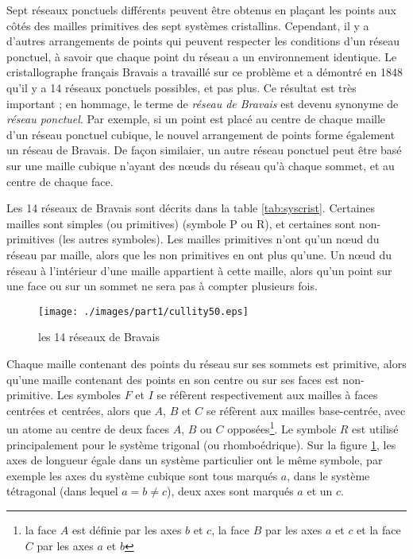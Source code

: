 Sept réseaux ponctuels différents peuvent être obtenus en plaçant les
points aux côtés des mailles primitives des sept systèmes cristallins. Cependant,
il y a d'autres arrangements de points qui peuvent respecter les conditions d'un
réseau ponctuel, à savoir que chaque point du réseau a un environnement
identique. Le cristallographe français Bravais a travaillé sur ce problème et a
démontré en 1848 qu'il y a 14 réseaux ponctuels possibles, et pas plus. Ce
résultat est très important ; en hommage, le terme de \emph{réseau de Bravais}
est devenu synonyme de \emph{réseau ponctuel}. Par exemple, si un point est placé
au centre de chaque maille d'un réseau ponctuel cubique, le nouvel arrangement de
points forme également un réseau de Bravais. De façon similaier, un autre réseau
ponctuel peut être basé sur une maille cubique n'ayant des nœuds du réseau qu'à
chaque sommet, et au centre de chaque face.

Les 14 réseaux de Bravais sont décrits dans la table \ref{tab:syscrist}.
Certaines mailles sont simples (ou primitives) (symbole P ou R), et certaines
sont non-primitives (les autres symboles). Les mailles primitives n'ont qu'un
nœud du réseau par maille, alors que les non primitives en ont plus qu'une. Un
nœud du réseau à l'intérieur d'une maille appartient à cette maille, alors qu'un
point sur une face ou sur un sommet ne sera pas à compter plusieurs fois.

\begin{figure}
    \texttt{[image: ./images/part1/cullity50.eps]}
    \caption{les 14 réseaux de Bravais}
    \label{fig:bravaisschema}
\end{figure}

Chaque maille contenant des points du réseau sur ses sommets est primitive, alors
qu'une maille contenant des points en son centre ou sur ses faces est
non-primitive. Les symboles $F$ et $I$ se réfèrent respectivement aux mailles à
faces centrées et centrées, alors que $A$, $B$ et $C$ se réfèrent aux mailles
base-centrée, avec un atome au centre de deux faces $A$, $B$ ou $C$
opposées\footnote{la face $A$ est définie par les axes $b$ et $c$, la face $B$
par les axes $a$ et $c$ et la face $C$ par les axes $a$ et $b$}. Le symbole $R$
est utilisé principalement pour le système trigonal (ou rhomboédrique). Sur la
figure \ref{fig:bravaisschema}, les axes de longueur égale dans un système
particulier ont le même symbole, par exemple les axes du système cubique sont
tous marqués $a$, dans le système tétragonal (dans lequel $a = b \neq c$), deux
axes sont marqués $a$ et un $c$.

